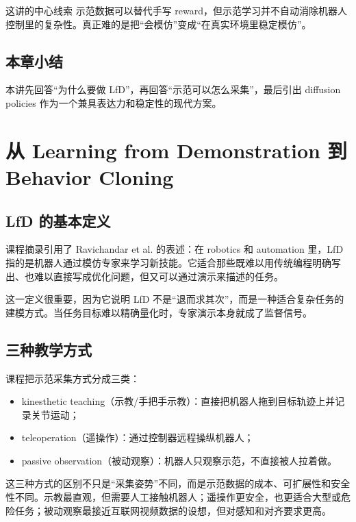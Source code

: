 \documentclass[a4paper]{article}
\begin{document}
\begin{importantbox}{这讲的中心线索}
示范数据可以替代手写 reward，但示范学习并不自动消除机器人控制里的复杂性。真正难的是把“会模仿”变成“在真实环境里稳定模仿”。
\end{importantbox}

\subsection{本章小结}

本讲先回答“为什么要做 LfD”，再回答“示范可以怎么采集”，最后引出 diffusion policies 作为一个兼具表达力和稳定性的现代方案。

\section{从 Learning from Demonstration 到 Behavior Cloning}

\subsection{LfD 的基本定义}

课程摘录引用了 Ravichandar et al. 的表述：在 robotics 和 automation 里，LfD 指的是机器人通过模仿专家来学习新技能。它适合那些既难以用传统编程明确写出、也难以直接写成优化问题，但又可以通过演示来描述的任务。

这一定义很重要，因为它说明 LfD 不是“退而求其次”，而是一种适合复杂任务的建模方式。当任务目标难以精确量化时，专家演示本身就成了监督信号。

\subsection{三种教学方式}

课程把示范采集方式分成三类：
\begin{itemize}
  \item kinesthetic teaching（示教/手把手示教）：直接把机器人拖到目标轨迹上并记录关节运动；
  \item teleoperation（遥操作）：通过控制器远程操纵机器人；
  \item passive observation（被动观察）：机器人只观察示范，不直接被人拉着做。
\end{itemize}

这三种方式的区别不只是“采集姿势”不同，而是示范数据的成本、可扩展性和安全性不同。示教最直观，但需要人工接触机器人；遥操作更安全，也更适合大型或危险任务；被动观察最接近互联网视频数据的设想，但对感知和对齐要求更高。
\end{document}
